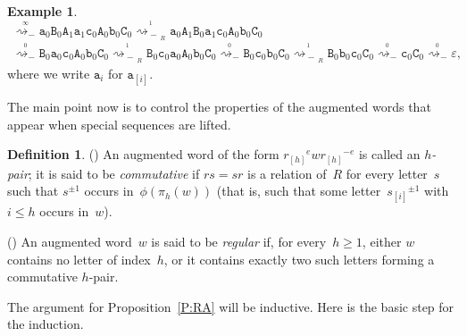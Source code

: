 \documentclass{amsart}
\numberwithin{equation}{section}
\theoremstyle{plain}
\theoremstyle{definition}
\newtheorem{defi}[prop]{Definition}
\newtheorem{exam}[prop]{Example}
\let\ge=\geqslant
\newcounter{ITEM}
\let\le=\leqslant
\begin{document}
\begin{exam}
\begin{multline*}
{\mathrel{\overset{{}_{\infty}}{\rightsquigarrow_{\!\!\!\!\!\!-}}}} {{\mathtt{a}}_{0}} {{\mathtt{B}}_{0}} {{\mathtt{A}}_{1}} {{\mathtt{a}}_{1}} {{\mathtt{c}}_{0}} {{\mathtt{A}}_{0}} {{\mathtt{b}}_{0}} {{\mathtt{C}}_{0}}
{\mathrel{\overset{{}_{1}}{\rightsquigarrow_{\!\!\!\!\!\!-\,{{\!{}_{R}}}}}}} {{\mathtt{a}}_{0}} {{\mathtt{A}}_{1}} {{\mathtt{B}}_{0}} {{\mathtt{a}}_{1}} {{\mathtt{c}}_{0}} {{\mathtt{A}}_{0}} {{\mathtt{b}}_{0}} {{\mathtt{C}}_{0}}\\
{\mathrel{\overset{{}_{0}}{\rightsquigarrow_{\!\!\!\!\!\!-}}}} {{\mathtt{B}}_{0}} {{\mathtt{a}}_{0}} {{\mathtt{c}}_{0}} {{\mathtt{A}}_{0}} {{\mathtt{b}}_{0}} {{\mathtt{C}}_{0}}
{\mathrel{\overset{{}_{1}}{\rightsquigarrow_{\!\!\!\!\!\!-\,{{\!{}_{R}}}}}}} {{\mathtt{B}}_{0}} {{\mathtt{c}}_{0}} {{\mathtt{a}}_{0}} {{\mathtt{A}}_{0}} {{\mathtt{b}}_{0}} {{\mathtt{C}}_{0}}
{\mathrel{\overset{{}_{0}}{\rightsquigarrow_{\!\!\!\!\!\!-}}}} {{\mathtt{B}}_{0}} {{\mathtt{c}}_{0}} {{\mathtt{b}}_{0}} {{\mathtt{C}}_{0}}
{\mathrel{\overset{{}_{1}}{\rightsquigarrow_{\!\!\!\!\!\!-\,{{\!{}_{R}}}}}}} {{\mathtt{B}}_{0}} {{\mathtt{b}}_{0}} {{\mathtt{c}}_{0}} {{\mathtt{C}}_{0}}
{\mathrel{\overset{{}_{0}}{\rightsquigarrow_{\!\!\!\!\!\!-}}}} {{\mathtt{c}}_{0}} {{\mathtt{C}}_{0}}
{\mathrel{\overset{{}_{0}}{\rightsquigarrow_{\!\!\!\!\!\!-}}}} {\varepsilon},
\end{multline*}
where we write ${{\mathtt{a}}_{{i}}}$ for ${{\mathtt{a}}_{{[{i}]}}}$.
\end{exam}

The main point now is to control the properties of the augmented words that appear when special sequences are lifted. 

\begin{defi}
{\setcounter{ITEM}{1}\leavevmode\hbox{\rm()}} An augmented word of the form ${{r}_{[{h}]}}^{e} {w} {{r}_{[{h}]}}^{-{e}}$ is called an \emph{${h}$-pair}; it is said to be \emph{commutative} if ${r} {s} = {s} {r}$ is a relation of~${R}$ for every letter~${s}$ such that ${s}^{\pm1}$ occurs in~$\phi(\pi_{h}({w}))$ (that is, such that some letter~${{s}_{[{i}]}}^{\pm1}$ with ${i} \le {h}$ occurs in~${w}$).

{\setcounter{ITEM}{2}\leavevmode\hbox{\rm()}} An augmented word~${w}$ is said to be \emph{regular} if, for every~${h} \ge 1$, either ${w}$ contains no letter of index~${h}$, or it contains exactly two such letters forming a commutative ${h}$-pair.
\end{defi}

The argument for Proposition~\ref{P:RA} will be inductive. Here is the basic step for the induction.
\end{document}
